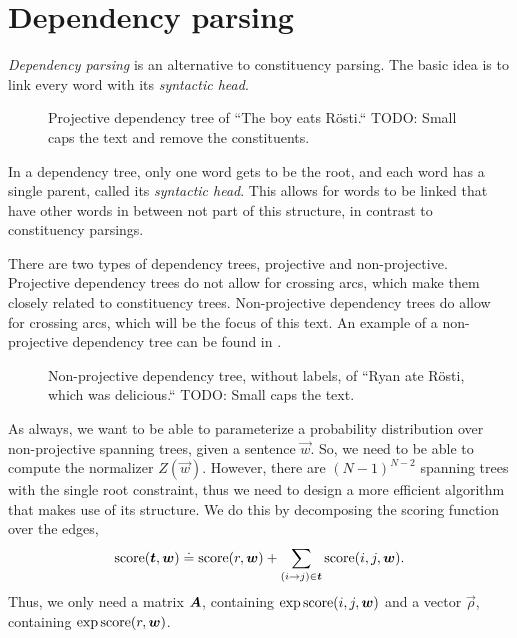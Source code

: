 \section{Dependency parsing}

\textit{Dependency parsing} is an alternative to constituency parsing. The
basic idea is to link every word with its \textit{syntactic head}.

\begin{figure}[h!]
    \centering
    \caption{Projective dependency tree of ``The boy eats Rösti.`` TODO: Small
    caps the text and remove the constituents.}
    \label{fig:dependency-parse}
\end{figure}

In a dependency tree, only one word gets to be the root, and each word has a
single parent, called its \textit{syntactic head}. This allows for words to be
linked that have other words in between not part of this structure, in contrast
to constituency parsings.

There are two types of dependency trees, projective and non-projective.
Projective dependency trees do not allow for crossing arcs, which make them
closely related to constituency trees. Non-projective dependency trees do allow
for crossing arcs, which will be the focus of this text. An example of a
non-projective dependency tree can be found in
.

\begin{figure}[ht]
    \centering
    \caption{Non-projective dependency tree, without labels, of ``Ryan ate
    Rösti, which was delicious.`` TODO: Small caps the text.}
    \label{fig:non-projective-dependency-tree}
\end{figure}

As always, we want to be able to parameterize a probability distribution over
non-projective spanning trees, given a sentence $\vec{w}$. So, we need to be
able to compute the normalizer $Z(\vec{w})$. However, there are $(N-1)^{N-2}$
spanning trees with the single root constraint, thus we need to design a more
efficient algorithm that makes use of its structure. We do this by decomposing
the scoring function over the edges, \[
  \mathrm{score}(\bm{t},\bm{w}) \doteq \mathrm{score}(r,\bm{w}) + \sum_{(i\to j)\in\bm{t}} \mathrm{score}(i,j,\bm{w})
.\]
Thus, we only need a matrix $\bm{A}$, containing $\exp \mathrm{score}(i,j,\bm{w})$ and a
vector $\vec{\rho}$, containing $\exp \mathrm{score}(r,\bm{w})$.

